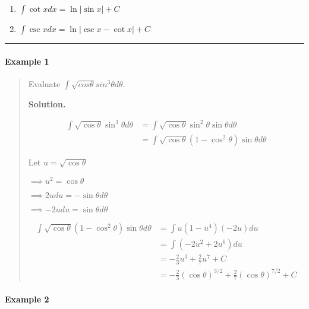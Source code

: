 \documentclass[
]{article}
\begin{document}
\begin{enumerate}
\def\labelenumi{\arabic{enumi}.}
\setcounter{enumi}{2}
\item
  \(\displaystyle \int \cot x dx = \ln|\sin x| + C\)
\item
  \(\displaystyle \int \csc x dx = \ln|\csc x - \cot x| + C\)
\end{enumerate}

\begin{center}\rule{0.5\linewidth}{0.5pt}\end{center}

\hypertarget{example-1-6}{%
\paragraph*{Example 1}\label{example-1-6}}

\begin{quote}
Evaluate \(\displaystyle \int \sqrt{cos \theta} sin^3 \theta d\theta\).

\textbf{Solution.}

\begin{align*}
\int \sqrt{\cos \theta} \sin^3 \theta d\theta &= \int \sqrt{\cos \theta}\sin^2 \theta \sin \theta d\theta \\
&= \int \sqrt{\cos \theta}(1 - \cos^2 \theta) \sin \theta d\theta
\end{align*}

Let \(u = \sqrt{\cos \theta}\)

\(\implies u^2 = \cos \theta\)

\(\implies 2udu = -\sin \theta d\theta\)

\(\implies -2udu = \sin \theta d\theta\)

\begin{align*}
\int \sqrt{\cos \theta}(1 - \cos^2 \theta) \sin \theta d\theta &= \int u(1-u^4)(-2u)du \\
&= \int (-2u^2 + 2u^6)du \\
&= -\frac{2}{3}u^3 +\frac{2}{7} u^7 + C \\
&= -\frac{2}{3}(\cos \theta)^{3/2} + \frac{2}{7}(\cos \theta)^{7/2}+C
\end{align*}
\end{quote}

\hypertarget{example-2-6}{%
\paragraph*{Example 2}\label{example-2-6}}
\end{document}
